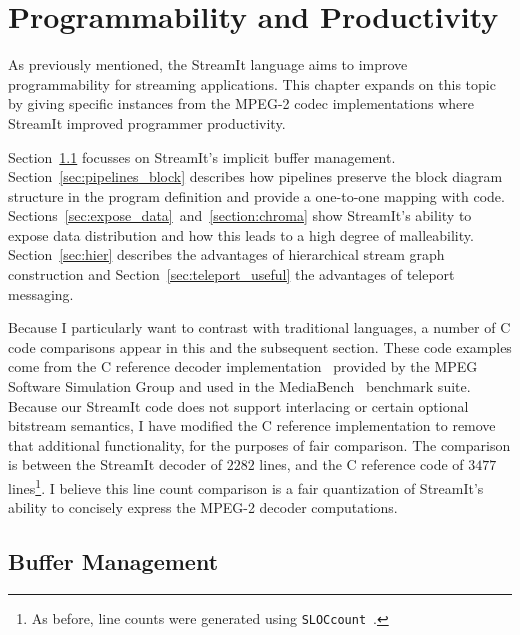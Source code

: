 \chapter{Programmability and Productivity}
\label{chapter:compare}

As previously mentioned, the StreamIt language aims to improve 
programmability for streaming applications. This chapter expands 
on this topic by giving specific instances from the MPEG-2 codec 
implementations where StreamIt improved programmer productivity.

Section~\ref{sec:buffer_management} focusses on StreamIt's 
implicit buffer management. Section~\ref{sec:pipelines_block}
describes how pipelines preserve the block diagram structure
in the program definition and provide a one-to-one mapping with
code. Sections~\ref{sec:expose_data}~and~\ref{section:chroma}
show StreamIt's ability to expose data distribution and
how this leads to a high degree of malleability. 
Section~\ref{sec:hier} describes the advantages of
hierarchical stream graph construction and 
Section~\ref{sec:teleport_useful} the advantages of 
teleport messaging.

Because I particularly want to contrast with 
traditional languages, a number of C code comparisons appear in 
this and the subsequent section. These code examples come from the 
C reference decoder implementation~\cite{reference-mpeg-c} provided 
by the MPEG Software Simulation Group and used in the 
MediaBench~\cite{lee97mediabench} benchmark suite. Because our 
StreamIt code does not support interlacing or certain optional 
bitstream semantics, I have modified the C reference implementation 
to remove that additional functionality, for the purposes of fair 
comparison. The comparison is between the StreamIt decoder of $2282$ 
lines, and the C reference code of $3477$ lines\footnote{As before, line counts 
were generated using \texttt{SLOCcount}~\cite{sloccount}.}. 
I believe this line count comparison is a fair 
quantization of StreamIt's ability to concisely express the MPEG-2 
decoder computations.

\section{Buffer Management}
\label{sec:buffer_management}

